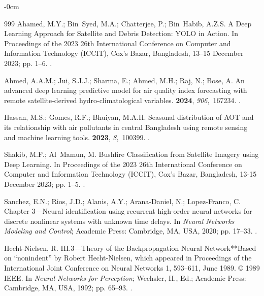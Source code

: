 \documentclass[water,article,accept,pdftex,oneauhor]{Definitions/mdpi}
\begin{document}
{{{\begin{adjustwidth}{-\extralength}{0cm}
\begin{thebibliography}{999}
Ahamed, M.Y.; Bin~Syed, M.A.; Chatterjee, P.; Bin~Habib, A.Z.S.
\newblock A Deep Learning Approach for Satellite and Debris Detection: YOLO in
  Action.
\newblock In Proceedings of the 2023 26th International Conference on Computer
  and Information Technology (ICCIT), Cox's Bazar, Bangladesh, 13--15 December 2023; pp. 1--6.
.

Ahmed, A.A.M.; Jui, S.J.J.; Sharma, E.; Ahmed, M.H.; Raj, N.; Bose, A.
\newblock An advanced deep learning predictive model for air quality index
  forecasting with remote satellite-derived hydro-climatological variables.
 {\bf 2024}, {\em 906},~167234.
.

Hassan, M.S.; Gomes, R.F.; Bhuiyan, M.A.H.
\newblock Seasonal distribution of AOT and its relationship with air pollutants
  in central Bangladesh using remote sensing and machine learning tools.
 {\bf 2023}, {\em 8},~100399.
.

Shakib, M.F.; Al~Mamun, M.
\newblock Bushfire Classification from Satellite Imagery using Deep Learning.
\newblock In Proceedings of the 2023 26th International Conference on Computer
  and Information Technology (ICCIT), Cox's Bazar, Bangladesh, 13-15 December 2023; pp. 1--5.
.

Sanchez, E.N.; Rios, J.D.; Alanis, A.Y.; Arana-Daniel, N.; Lopez-Franco, C.
\newblock Chapter 3---Neural identification using recurrent high-order neural
  networks for discrete nonlinear systems with unknown time delays. In {\em
  Neural Networks Modeling and Control}; Academic Press: Cambridge, MA, USA, %
  2020; pp. 17--33.
.

Hecht-Nielsen, R.
\newblock III.3---Theory of the Backpropagation Neural Network**Based on
  “nonindent” by Robert Hecht-Nielsen, which appeared in Proceedings of the
  International Joint Conference on Neural Networks 1, 593–611, June 1989. ©
  1989 IEEE. In {\em Neural Networks for Perception}; Wechsler, H., Ed.;
  Academic Press: Cambridge, MA, USA, %
  1992; pp. 65--93.
.


\end{thebibliography}
\end{adjustwidth}}}}
\end{document}
